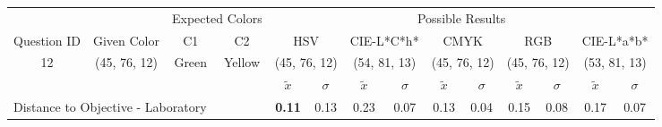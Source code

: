 \begin{table}[H]
  \resizebox{\textwidth}{!} {
  \begin{tabular}{lccccccccccccc}
    \hline
    \multicolumn{1}{c}{}                              &                                      & \multicolumn{2}{c}{Expected Colors}                   & \multicolumn{10}{c}{Possible Results}                                                                                                                                                                                                                                                                                        \\ \cline{3-14}
    \multicolumn{1}{c}{\multirow{-2}{*}{Question ID}} & \multirow{-2}{*}{Given Color}        & C1                       & C2                         & \multicolumn{2}{c}{HSV}                                        & \multicolumn{2}{c}{CIE-L*C*h*}                                 & \multicolumn{2}{c}{CMYK}                                       & \multicolumn{2}{c}{RGB}                                        & \multicolumn{2}{c}{CIE-L*a*b*}                                 \\ \hline
    \multicolumn{1}{c}{12}                             & \cellcolor[HTML]{80FF00}(45, 76, 12) & \multicolumn{1}{c|}{Green} & \multicolumn{1}{c|}{Yellow}  & \multicolumn{2}{c|}{\cellcolor[HTML]{80FF00}(45, 76, 12)}      & \multicolumn{2}{c|}{\cellcolor[HTML]{B1FF00}(54, 81, 13)}       & \multicolumn{2}{c|}{\cellcolor[HTML]{80FF00}(45, 76, 12)}       & \multicolumn{2}{c|}{\cellcolor[HTML]{80FF00}(45, 76, 12)}       & \multicolumn{2}{c|}{\cellcolor[HTML]{AEFF00}(53, 81, 13)}       \\ \hline
                                                      & \multicolumn{1}{l}{}                 & \multicolumn{1}{l}{}     & \multicolumn{1}{l}{}       & \multicolumn{1}{c}{$\tilde{x}$} & \multicolumn{1}{c}{$\sigma$} & \multicolumn{1}{c}{$\tilde{x}$} & \multicolumn{1}{c}{$\sigma$} & \multicolumn{1}{c}{$\tilde{x}$} & \multicolumn{1}{c}{$\sigma$} & \multicolumn{1}{c}{$\tilde{x}$} & \multicolumn{1}{c}{$\sigma$} & \multicolumn{1}{c}{$\tilde{x}$} & \multicolumn{1}{c}{$\sigma$} \\ \hline
    \multicolumn{4}{l}{Distance to Objective - Laboratory}                                                                                           & \multicolumn{1}{|c}{\textbf{0.11}}       & \multicolumn{1}{c|}{0.13}    & \multicolumn{1}{|c}{0.23}       & \multicolumn{1}{c|}{0.07}    & \multicolumn{1}{|c}{0.13}       & \multicolumn{1}{c|}{0.04}    & \multicolumn{1}{|c}{0.15}       & \multicolumn{1}{c|}{0.08}    & \multicolumn{1}{|c}{0.17}       & \multicolumn{1}{c|}{0.07}    \\

\end{tabular}}
\end{table}

